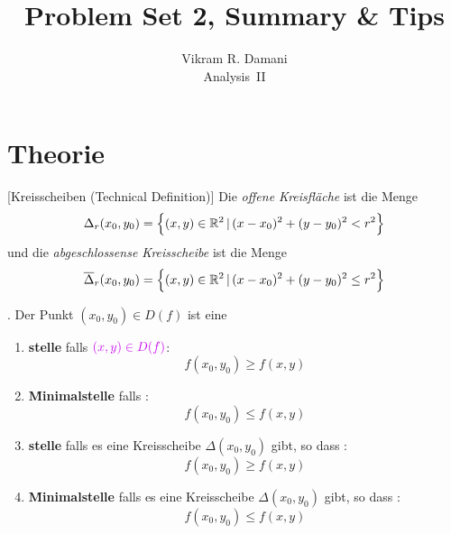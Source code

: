 \documentclass[12pt]{article}
\begin{document}
\title{\vspace*{-2.5em}Problem Set 2, Summary \& Tips}
\author{Vikram R. Damani\\
        Analysis~II}

\maketitle

\section{Theorie}

\begin{defn}{[Kreisscheiben (Technical Definition)]}
    Die \emph{offene Kreisfläche} ist die Menge
    \begin{align*}
        \Delta_r(x_0,y_0)=\left\{(x,y)\in\mathbb{R}^2\,|\,(x-x_0)^2+(y-y_0)^2<r^2\right\}
    \end{align*}
    und die \emph{abgeschlossense Kreisscheibe} ist die Menge
    \begin{align*}
        \overline{\Delta}_r(x_0,y_0)=\left\{(x,y)\in\mathbb{R}^2\,|\,(x-x_0)^2+(y-y_0)^2\leq r^2\right\}
    \end{align*}
\end{defn}

\begin{thmb}{\np{\emph{[Extrema]}}.}
    Der Punkt $(x_0,y_0)\in D(f)$ ist eine
        \begin{enumerate}[label=(\alph*), topsep=0pt, itemsep=0.15em]
                \item \textbf{ stelle} falls  $\p{(x,y)\in D(f)}$: \[f(x_0,y_0)\geq f(x,y)\]
                \item \textbf{ \r{Minimal}stelle} falls : \[f(x_0,y_0)\leq f(x,y)\]
                \item \textbf{ stelle} falls es eine Kreisscheibe $\Delta(x_0,y_0)$ gibt, so dass : \[f(x_0,y_0)\geq f(x,y)\]
                \item \textbf{ \r{Minimal}stelle} falls es eine Kreisscheibe $\Delta(x_0,y_0)$ gibt, so dass : \[f(x_0,y_0)\leq f(x,y)\]
        \end{enumerate}
\end{thmb}\vspace*{1em}
\end{document}
